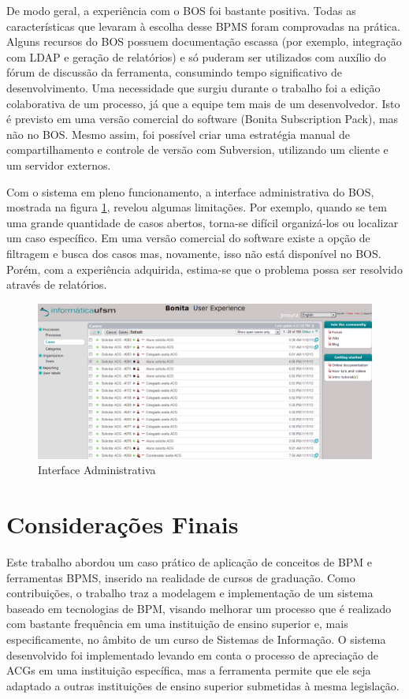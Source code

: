 \documentclass[12pt]{article}
\begin{document}
De modo geral, a experiência com o BOS foi bastante positiva. Todas as características que levaram à escolha desse BPMS foram comprovadas na prática. Alguns recursos do BOS possuem documentação escassa (por exemplo, integração com LDAP e geração de relatórios) e só puderam ser utilizados com auxílio do fórum de discussão da ferramenta, consumindo tempo significativo de desenvolvimento. Uma necessidade que surgiu durante o trabalho foi a edição colaborativa de um processo, já que a equipe tem mais de um desenvolvedor. Isto é previsto em uma versão comercial do software (Bonita Subscription Pack), mas não no BOS. Mesmo assim, foi possível criar uma estratégia manual de compartilhamento e controle de versão com Subversion, utilizando um cliente e um servidor externos.

Com o sistema em pleno funcionamento, a interface administrativa do BOS, mostrada na figura \ref{fig:interfaceadm}, revelou algumas limitações. Por exemplo, quando se tem uma grande quantidade de casos abertos, torna-se difícil organizá-los ou localizar um caso específico. Em uma versão comercial do software existe a opção de filtragem e busca dos casos mas, novamente, isso não está disponível no BOS. Porém, com a experiência adquirida, estima-se que o problema possa ser resolvido através de relatórios.

\begin{figure}[ht]
\centering
\includegraphics[width=.99\textwidth]{images/interfaceAdministrativa.png}
\caption{Interface Administrativa}
\label{fig:interfaceadm}
\end{figure}

\section{Considerações Finais}

Este trabalho abordou um caso prático de aplicação de conceitos de BPM e ferramentas BPMS, inserido na realidade de cursos de graduação. Como contribuições, o trabalho traz a modelagem e implementação de um sistema baseado em tecnologias de BPM, visando melhorar um processo que é realizado com bastante frequência em uma instituição de ensino superior e, mais especificamente, no âmbito de um curso de Sistemas de Informação. O sistema desenvolvido foi implementado levando em conta o processo de apreciação de ACGs em uma instituição específica, mas a ferramenta permite que ele seja adaptado a outras instituições de ensino superior submetidas à mesma legislação.
\end{document}
